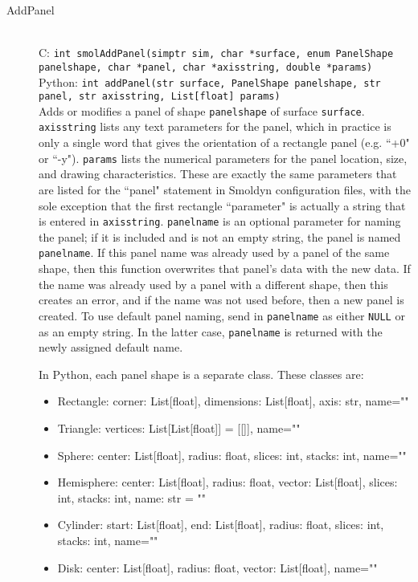 \documentclass {book}
\newcommand {\ttt} {\texttt}
\begin{document}
\begin{description}
\item[AddPanel]
\hfill \\
C: \ttt{int smolAddPanel(simptr sim, char *surface, enum PanelShape panelshape, char *panel, char *axisstring, double *params)}\\
Python: \ttt{int addPanel(str surface, PanelShape panelshape, str panel, str axisstring, List[float] params)}\\
Adds or modifies a panel of shape \ttt{panelshape} of surface \ttt{surface}. \ttt{axisstring} lists any text parameters for the panel, which in practice is only a single word that gives the orientation of a rectangle panel (e.g. ``+0" or ``-y"). \ttt{params} lists the numerical parameters for the panel location, size, and drawing characteristics. These are exactly the same parameters that are listed for the ``panel" statement in Smoldyn configuration files, with the sole exception that the first rectangle ``parameter" is actually a string that is entered in \ttt{axisstring}. \ttt{panelname} is an optional parameter for naming the panel; if it is included and is not an empty string, the panel is named \ttt{panelname}. If this panel name was already used by a panel of the same shape, then this function overwrites that panel's data with the new data. If the name was already used by a panel with a different shape, then this creates an error, and if the name was not used before, then a new panel is created. To use default panel naming, send in \ttt{panelname} as either \ttt{NULL} or as an empty string. In the latter case, \ttt{panelname} is returned with the newly assigned default name.

In Python, each panel shape is a separate class. These classes are:
\begin{itemize}
\item Rectangle: corner: List[float], dimensions: List[float], axis: str, name=""
\item Triangle: vertices: List[List[float]] = [[]], name=""
\item Sphere: center: List[float], radius: float, slices: int, stacks: int, name=""
\item Hemisphere: center: List[float], radius: float, vector: List[float], slices: int, stacks: int, name: str = ""
\item Cylinder: start: List[float], end: List[float], radius: float, slices: int, stacks: int, name=""
\item Disk: center: List[float], radius: float, vector: List[float], name=""
\end{itemize}


\end{description}
\end{document}
